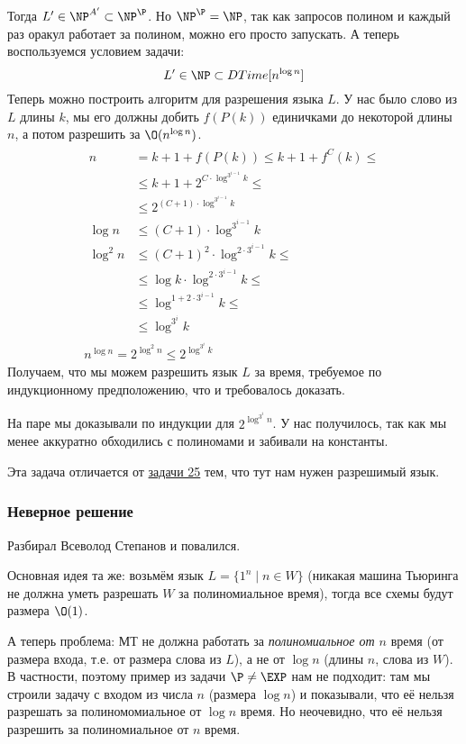 		Тогда $L' \in \NP^{A'} \subset \NP^\P$.
		Но $\NP^\P=\NP$, так как запросов полином и каждый раз оракул работает за полином, можно его просто запускать.
		А теперь воспользуемся условием задачи:
		\[ L' \in \NP \subset DTime[n^{\log n}] \]
		Теперь можно построить алгоритм для разрешения языка $L$.
		У нас было слово из $L$ длины $k$, мы его должны добить $f(P(k))$ единичками до некоторой длины $n$, а потом разрешить за $\O(n^{\log n})$.
		\begin{gather*}
			\begin{aligned}
				n &= k + 1 + f(P(k)) \le k + 1 + f^C(k) \le \\
				  &\le k + 1 + 2^{C \cdot \log^{3^{i-1}} k} \le \\
				  &\le 2^{(C+1) \cdot \log^{3^{i-1}} k} \\
				\log n &\le (C+1) \cdot \log^{3^{i-1}} k \\
				\log^2 n &\le (C+1)^2 \cdot \log^{2\cdot3^{i-1}} k \le \\
				         &\le \log k \cdot \log^{2\cdot3^{i-1}} k \le \\
				         &\le \log^{1+2\cdot3^{i-1}} k \le \\
				         &\le \log^{3^i} k
			\end{aligned} \\
			n^{\log n} = 2^{\log^2n} \le 2^{\log^{3^i} k}
		\end{gather*}
		Получаем, что мы можем разрешить язык $L$ за время, требуемое по индукционному предположению,
		что и требовалось доказать.
		
		\begin{Rem}
			На паре мы доказывали по индукции для $2^{\log^{3^i} n}$.
			У нас получилось, так как мы менее аккуратно обходились с полиномами и забивали на константы.
		\end{Rem}

	Эта задача отличается от \hyperref[prob25]{задачи 25} тем, что тут нам нужен разрешимый язык.
	\subsubsection{Неверное решение}
		Разбирал Всеволод Степанов и повалился.

		Основная идея та же: возьмём язык $L=\{1^n \mid n \in W\}$ (никакая машина Тьюринга не должна уметь разрешать $W$ за полиномиальное время),
		тогда все схемы будут размера $\O(1)$.

		А теперь проблема: МТ не должна работать за \textit{полиномиальное от $n$} время (от размера входа,
		т.е. от размера слова из $L$), а не от $\log n$ (длины $n$, слова из $W$).
		В частности, поэтому пример из задачи $\P \neq \EXP$ нам не подходит:
		там мы строили задачу с входом из числа $n$ (размера $\log n$) и показывали,
		что её нельзя разрешать за полиномомиальное от $\log n$ время.
		Но неочевидно, что её нельзя разрешить за полиномиальное от $n$ время.


